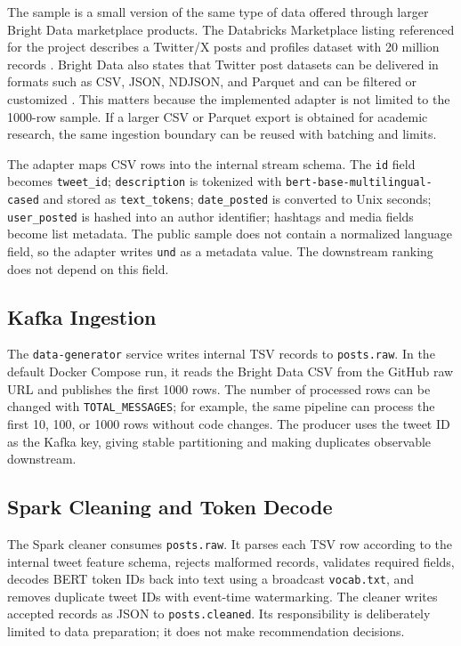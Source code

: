 \documentclass[conference]{IEEEtran}
\begin{document}
The sample is a small version of the same type of data offered through larger Bright Data marketplace products. The Databricks Marketplace listing referenced for the project describes a Twitter/X posts and profiles dataset with 20 million records \cite{databricksBrightData}. Bright Data also states that Twitter post datasets can be delivered in formats such as CSV, JSON, NDJSON, and Parquet and can be filtered or customized \cite{brightdataProduct}. This matters because the implemented adapter is not limited to the 1000-row sample. If a larger CSV or Parquet export is obtained for academic research, the same ingestion boundary can be reused with batching and limits.

The adapter maps CSV rows into the internal stream schema. The \texttt{id} field becomes \texttt{tweet\_id}; \texttt{description} is tokenized with \texttt{bert-base-multilingual-cased} and stored as \texttt{text\_tokens}; \texttt{date\_posted} is converted to Unix seconds; \texttt{user\_posted} is hashed into an author identifier; hashtags and media fields become list metadata. The public sample does not contain a normalized language field, so the adapter writes \texttt{und} as a metadata value. The downstream ranking does not depend on this field.

\subsection{Kafka Ingestion}
The \texttt{data-generator} service writes internal TSV records to \texttt{posts.raw}. In the default Docker Compose run, it reads the Bright Data CSV from the GitHub raw URL and publishes the first 1000 rows. The number of processed rows can be changed with \texttt{TOTAL\_MESSAGES}; for example, the same pipeline can process the first 10, 100, or 1000 rows without code changes. The producer uses the tweet ID as the Kafka key, giving stable partitioning and making duplicates observable downstream.

\subsection{Spark Cleaning and Token Decode}
The Spark cleaner consumes \texttt{posts.raw}. It parses each TSV row according to the internal tweet feature schema, rejects malformed records, validates required fields, decodes BERT token IDs back into text using a broadcast \texttt{vocab.txt}, and removes duplicate tweet IDs with event-time watermarking. The cleaner writes accepted records as JSON to \texttt{posts.cleaned}. Its responsibility is deliberately limited to data preparation; it does not make recommendation decisions.
\end{document}
